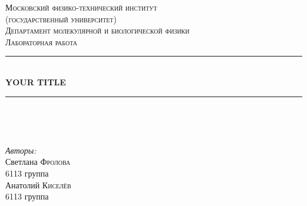 \documentclass[a4paper, 12pt]{article}
\begin{document}
\begin{titlepage}

\newcommand{\HRule}{\rule{\linewidth}{0.5mm}} %

\center %
 

\textsc{\LARGE Московский физико-технический институт\\(государственный университет)}\\[1,5cm] %
\textsc{\Large Департамент молекулярной и биологической физики}\\[2cm] %
\textsc{\large Лабораторная работа}\\[0.5cm] %


\HRule
\\[0.4cm]
{ \huge \bfseries YOUR TITLE}
\\[0.2cm] %
\HRule
\\[1.5cm]


 
\begin{minipage}{0.4\textwidth}
	\begin{flushleft}		
	\end{flushleft}
\end{minipage}
~
\begin{minipage}{0.4\textwidth}
	\begin{flushright} \large
		\emph{Авторы:}\\
		Светлана \textsc{Фролова} \\
		6113 группа \\
		Анатолий \textsc{Киселёв} \\
		6113 группа
	\end{flushright}
\end{minipage}



\end{titlepage}
\end{document}
